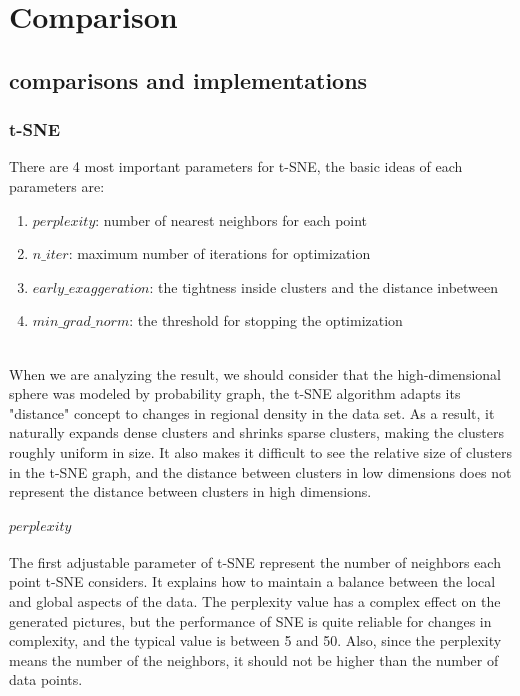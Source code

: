 \part{Comparison} \label{part:Comparison and implementation}

\chapter{comparisons and implementations}

\section{t-SNE}
There are 4 most important parameters for t-SNE, the basic ideas of each parameters are: 

\begin{enumerate}[1)]
\item $perplexity$: number of nearest neighbors for each point
\item $n\_iter$: maximum number of iterations for optimization
\item $early\_exaggeration$: the tightness inside clusters and the distance inbetween
\item $min\_grad\_norm$: the threshold for stopping the optimization 
\end{enumerate}
\\

\noindent When we are analyzing the result, we should consider that the high-dimensional sphere was modeled by probability graph, the t-SNE algorithm adapts its "distance" concept to changes in regional density in the data set. As a result, it naturally expands dense clusters and shrinks sparse clusters, making the clusters roughly uniform in size. It also makes it difficult to see the relative size of clusters in the t-SNE graph, and the distance between clusters in low dimensions does not represent the distance between clusters in high dimensions.\\

\subsection{$perplexity$}

\noindent The first adjustable parameter of t-SNE represent the number of neighbors each point t-SNE considers. It explains how to maintain a balance between the local and global aspects of the data. The perplexity value has a complex effect on the generated pictures, but the performance of SNE is quite reliable for changes in complexity, and the typical value is between 5 and 50\cite{ref9}. Also, since the perplexity means the number of the neighbors, it should not be higher than the number of data points.\\

